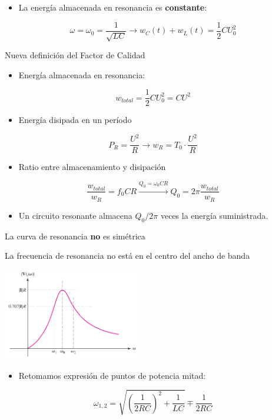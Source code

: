 \begin{itemize}
\item La energía almacenada en resonancia es \textbf{constante}:
\end{itemize}
\[
\omega = \omega_0 = \frac{1}{\sqrt{LC}} \rightarrow \boxed{w_C(t) + w_L(t) = \frac{1}{2} C U_0^2}
\]

{Nueva definición del Factor de Calidad}

\begin{itemize}
\item Energía almacenada en resonancia:
\end{itemize}
\[
w_{total} = \frac{1}{2} C U_0^2 = C U^2
\]

\begin{itemize}
\item Energía disipada en un período
\end{itemize}
\[
P_R = \frac{U^2}{R} \rightarrow w_R = T_0 \cdot \frac{U^2}{R}
\]

\begin{itemize}
\item Ratio entre almacenamiento y disipación
\end{itemize}

\[
\frac{w_{total}}{w_R} = f_0 C R \xrightarrow{Q_0 = \omega_0 C R} \boxed{Q_0 = 2 \pi \frac{w_{total}}{w_R}}
\]

\begin{itemize}
\item Un circuito resonante almacena \(Q_0/2\pi\) veces la energía suministrada.
\end{itemize}

{La curva de resonancia \textbf{no} es simétrica}

La frecuencia de resonancia no está en el centro del ancho de banda
\begin{center}
\includegraphics[height=4cm]{../figs/CurvaResonancia.pdf}
\end{center}


\begin{itemize}
\item Retomamos expresión de puntos de potencia mitad:
\end{itemize}
\[
\omega_{1,2} = \sqrt{\left(\frac{1}{2RC}\right)^2 + \frac{1}{LC}} \mp \frac{1}{2RC}
\]

